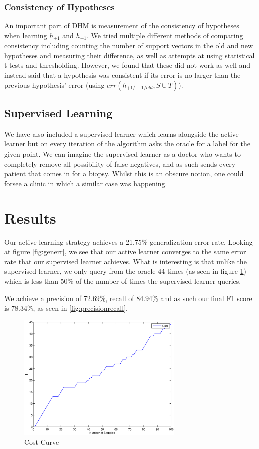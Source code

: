 \documentclass[12pt]{article}
\begin{document}
\subsubsection{Consistency of Hypotheses}
An important part of DHM is measurement of the consistency of hypotheses when learning $h_{+1}$ and $h_{-1}$. We tried multiple different methods of comparing consistency including counting the number of support vectors in the old and new hypotheses and measuring their difference, as well as attempts at using statistical t-tests and thresholding. However, we found that these did not work as well and instead said that a hypothesis was consistent if its error is no larger than the previous hypothesis' error (using $err(h_{+1/-1/old}, S\cup T)$).

\subsection{Supervised Learning}

We have also included a supervised learner which learns alongside the active learner but on every iteration of the algorithm asks the oracle for a label for the given point. We can imagine the supervised learner as a doctor who wants to completely remove all possibility of false negatives, and as such sends every patient that comes in for a biopsy. Whilst this is an obscure notion, one could forsee a clinic in which a similar case was happening. 

\section{Results}
Our active learning strategy achieves a 21.75\% generalization error rate. Looking at figure \ref{fig:generr}, we see that our active learner converges to the same error rate that our supervised learner achieves. What is interesting is that unlike the supervised learner, we only query from the oracle 44 times (as seen in figure \ref{fig:costcurve}) which is less than 50\% of the number of times the supervised learner queries.

We achieve a precision of 72.69\%, recall of 84.94\% and as such our final F1 score is 78.34\%, as seen in \ref{fig:precisionrecall}.

\begin{figure}
	\centering
	\includegraphics[width=300px]{costcurve}
	\caption{Cost Curve}
	\label{fig:costcurve}
\end{figure}
\end{document}
